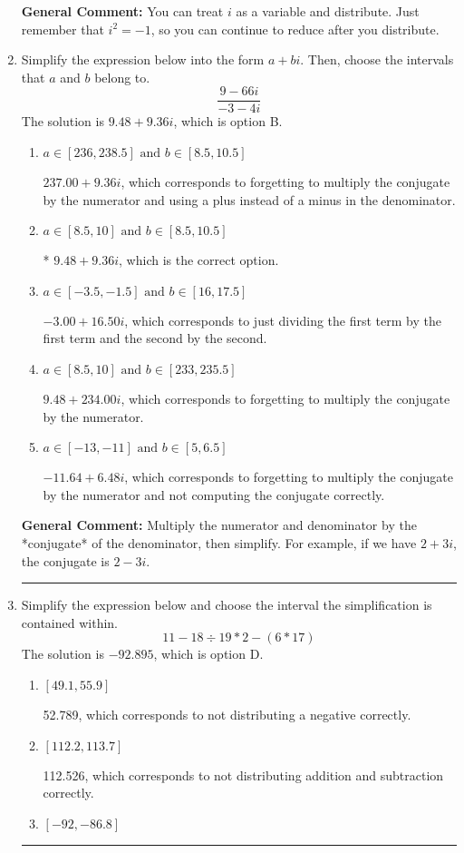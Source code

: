 \documentclass{extbook}[14pt]
\newcommand{\litem}[1]{\item #1

\rule{\textwidth}{0.4pt}}
\begin{document}
\begin{enumerate}
{\textbf{General Comment:} You can treat $i$ as a variable and distribute. Just remember that $i^2=-1$, so you can continue to reduce after you distribute.
}
\litem{
Simplify the expression below into the form $a+bi$. Then, choose the intervals that $a$ and $b$ belong to.
\[ \frac{9 - 66 i}{-3 - 4 i} \]
The solution is \( 9.48  + 9.36 i \), which is option B.\begin{enumerate}[label=\Alph*.]
\item \( a \in [236, 238.5] \text{ and } b \in [8.5, 10.5] \)

 $237.00  + 9.36 i$, which corresponds to forgetting to multiply the conjugate by the numerator and using a plus instead of a minus in the denominator.
\item \( a \in [8.5, 10] \text{ and } b \in [8.5, 10.5] \)

* $9.48  + 9.36 i$, which is the correct option.
\item \( a \in [-3.5, -1.5] \text{ and } b \in [16, 17.5] \)

 $-3.00  + 16.50 i$, which corresponds to just dividing the first term by the first term and the second by the second.
\item \( a \in [8.5, 10] \text{ and } b \in [233, 235.5] \)

 $9.48  + 234.00 i$, which corresponds to forgetting to multiply the conjugate by the numerator.
\item \( a \in [-13, -11] \text{ and } b \in [5, 6.5] \)

 $-11.64  + 6.48 i$, which corresponds to forgetting to multiply the conjugate by the numerator and not computing the conjugate correctly.
\end{enumerate}

\textbf{General Comment:} Multiply the numerator and denominator by the *conjugate* of the denominator, then simplify. For example, if we have $2+3i$, the conjugate is $2-3i$.
}
\litem{
Simplify the expression below and choose the interval the simplification is contained within.
\[ 11 - 18 \div 19 * 2 - (6 * 17) \]
The solution is \( -92.895 \), which is option D.\begin{enumerate}[label=\Alph*.]
\item \( [49.1, 55.9] \)

 52.789, which corresponds to not distributing a negative correctly.
\item \( [112.2, 113.7] \)

 112.526, which corresponds to not distributing addition and subtraction correctly.
\item \( [-92, -86.8] \)


\end{enumerate}}
\end{enumerate}
\end{document}
